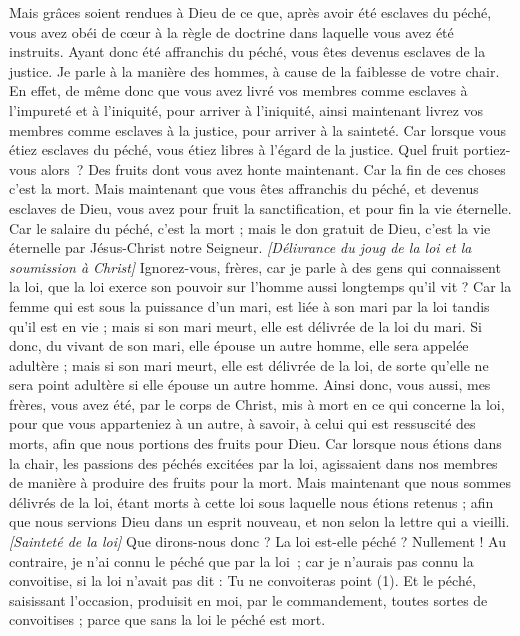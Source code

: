 \begin{multicols}{2}
Mais grâces soient rendues à Dieu de ce que, après avoir été esclaves du péché, vous avez obéi de cœur à la règle de doctrine dans laquelle vous avez été instruits.
Ayant donc été affranchis du péché, vous êtes devenus esclaves de la justice.
Je parle à la manière des hommes, à cause de la faiblesse de votre chair. En effet, de même donc que vous avez livré vos membres comme esclaves à l’impureté et à l’iniquité, pour arriver à l’iniquité, ainsi maintenant livrez vos membres comme esclaves à la justice, pour arriver à la sainteté.
Car lorsque vous étiez esclaves du péché, vous étiez libres à l'égard de la justice.
Quel fruit portiez-vous alors ? Des fruits dont vous avez honte maintenant. Car la fin de ces choses c’est la mort.
Mais maintenant que vous êtes affranchis du péché, et devenus esclaves de Dieu, vous avez pour fruit la sanctification, et pour fin la vie éternelle.
Car le salaire du péché, c'est la mort ; mais le don gratuit de Dieu, c'est la vie éternelle par Jésus-Christ notre Seigneur.
\textit{[Délivrance du joug de la loi et la soumission à Christ]}
\VerseOne{}Ignorez-vous, frères, car je parle à des gens qui connaissent la loi, que la loi exerce son pouvoir sur l’homme aussi longtemps qu’il vit ?
Car la femme qui est sous la puissance d'un mari, est liée à son mari par la loi tandis qu'il est en vie ; mais si son mari meurt, elle est délivrée de la loi du mari.
Si donc, du vivant de son mari, elle épouse un autre homme, elle sera appelée adultère ; mais si son mari meurt, elle est délivrée de la loi, de sorte qu'elle ne sera point adultère si elle épouse un autre homme.
Ainsi donc, vous aussi, mes frères, vous avez été, par le corps de Christ, mis à mort en ce qui concerne la loi, pour que vous apparteniez à un autre, à savoir, à celui qui est ressuscité des morts, afin que nous portions des fruits pour Dieu.
Car lorsque nous étions dans la chair, les passions des péchés excitées par la loi, agissaient dans nos membres de manière à produire des fruits pour la mort.
Mais maintenant que nous sommes délivrés de la loi, étant morts à cette loi sous laquelle nous étions retenus ; afin que nous servions Dieu dans un esprit nouveau, et non selon la lettre qui a vieilli.
\textit{[Sainteté de la loi]}
Que dirons-nous donc ? La loi est-elle péché ? Nullement ! Au contraire, je n'ai connu le péché que par la loi ; car je n’aurais pas connu la convoitise, si la loi n’avait pas dit : Tu ne convoiteras point (1).
Et le péché, saisissant l’occasion, produisit en moi, par le commandement, toutes sortes de convoitises ; parce que sans la loi le péché est mort.

\end{multicols}
